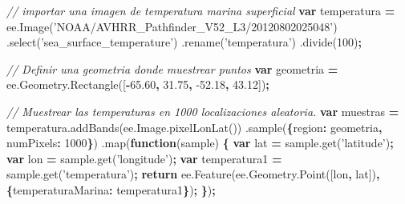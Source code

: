 \documentclass[
]{article}
\newenvironment{Shaded}{\begin{snugshade}}{\end{snugshade}}
\newcommand{\AttributeTok}[1]{\textcolor[rgb]{0.77,0.63,0.00}{#1}}
\newcommand{\CommentTok}[1]{\textcolor[rgb]{0.56,0.35,0.01}{\textit{#1}}}
\newcommand{\ControlFlowTok}[1]{\textcolor[rgb]{0.13,0.29,0.53}{\textbf{#1}}}
\newcommand{\DataTypeTok}[1]{\textcolor[rgb]{0.13,0.29,0.53}{#1}}
\newcommand{\DecValTok}[1]{\textcolor[rgb]{0.00,0.00,0.81}{#1}}
\newcommand{\FloatTok}[1]{\textcolor[rgb]{0.00,0.00,0.81}{#1}}
\newcommand{\KeywordTok}[1]{\textcolor[rgb]{0.13,0.29,0.53}{\textbf{#1}}}
\newcommand{\NormalTok}[1]{#1}
\newcommand{\OperatorTok}[1]{\textcolor[rgb]{0.81,0.36,0.00}{\textbf{#1}}}
\newcommand{\StringTok}[1]{\textcolor[rgb]{0.31,0.60,0.02}{#1}}
\newcommand{\VariableTok}[1]{\textcolor[rgb]{0.00,0.00,0.00}{#1}}
\begin{document}
\begin{Shaded}
\begin{Highlighting}[]
\CommentTok{// importar una imagen de temperatura marina superficial}
\KeywordTok{var}\NormalTok{ temperatura }\OperatorTok{=} \VariableTok{ee}\NormalTok{.}\AttributeTok{Image}\NormalTok{(}\StringTok{'NOAA/AVHRR_Pathfinder_V52_L3/20120802025048'}\NormalTok{)}
\NormalTok{  .}\AttributeTok{select}\NormalTok{(}\StringTok{'sea_surface_temperature'}\NormalTok{)}
\NormalTok{  .}\AttributeTok{rename}\NormalTok{(}\StringTok{'temperatura'}\NormalTok{)}
\NormalTok{  .}\AttributeTok{divide}\NormalTok{(}\DecValTok{100}\NormalTok{)}\OperatorTok{;}

\CommentTok{// Definir una geometria donde muestrear puntos}
\KeywordTok{var}\NormalTok{ geometria }\OperatorTok{=} \VariableTok{ee}\NormalTok{.}\VariableTok{Geometry}\NormalTok{.}\AttributeTok{Rectangle}\NormalTok{([}\OperatorTok{-}\FloatTok{65.60}\OperatorTok{,} \FloatTok{31.75}\OperatorTok{,} \FloatTok{-52.18}\OperatorTok{,} \FloatTok{43.12}\NormalTok{])}\OperatorTok{;}

\CommentTok{// Muestrear las temperaturas en 1000 localizaciones aleatoria.}
\KeywordTok{var}\NormalTok{ muestras }\OperatorTok{=} \VariableTok{temperatura}\NormalTok{.}\AttributeTok{addBands}\NormalTok{(}\VariableTok{ee}\NormalTok{.}\VariableTok{Image}\NormalTok{.}\AttributeTok{pixelLonLat}\NormalTok{())}
\NormalTok{  .}\AttributeTok{sample}\NormalTok{(}\OperatorTok{\{}\DataTypeTok{region}\OperatorTok{:}\NormalTok{ geometria}\OperatorTok{,} \DataTypeTok{numPixels}\OperatorTok{:} \DecValTok{1000}\OperatorTok{\}}\NormalTok{)}
\NormalTok{  .}\AttributeTok{map}\NormalTok{(}\KeywordTok{function}\NormalTok{(sample) }\OperatorTok{\{}
    \KeywordTok{var}\NormalTok{ lat }\OperatorTok{=} \VariableTok{sample}\NormalTok{.}\AttributeTok{get}\NormalTok{(}\StringTok{'latitude'}\NormalTok{)}\OperatorTok{;}
    \KeywordTok{var}\NormalTok{ lon }\OperatorTok{=} \VariableTok{sample}\NormalTok{.}\AttributeTok{get}\NormalTok{(}\StringTok{'longitude'}\NormalTok{)}\OperatorTok{;}
    \KeywordTok{var}\NormalTok{ temperatura1 }\OperatorTok{=} \VariableTok{sample}\NormalTok{.}\AttributeTok{get}\NormalTok{(}\StringTok{'temperatura'}\NormalTok{)}\OperatorTok{;}
    \ControlFlowTok{return} \VariableTok{ee}\NormalTok{.}\AttributeTok{Feature}\NormalTok{(}\VariableTok{ee}\NormalTok{.}\VariableTok{Geometry}\NormalTok{.}\AttributeTok{Point}\NormalTok{([lon}\OperatorTok{,}\NormalTok{ lat])}\OperatorTok{,} \OperatorTok{\{}\DataTypeTok{temperaturaMarina}\OperatorTok{:}\NormalTok{ temperatura1}\OperatorTok{\}}\NormalTok{)}\OperatorTok{;}
  \OperatorTok{\}}\NormalTok{)}\OperatorTok{;}


\end{Highlighting}
\end{Shaded}
\end{document}
